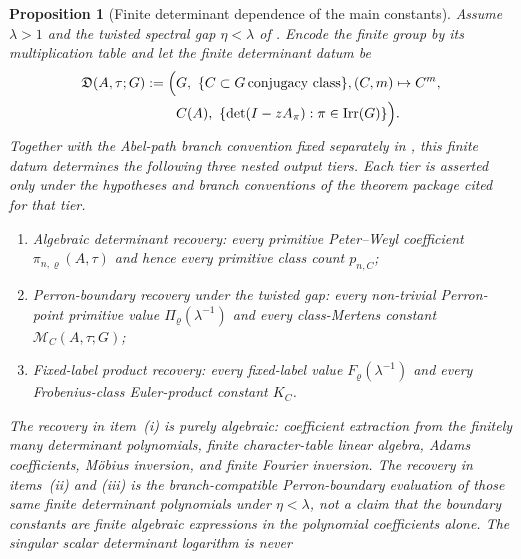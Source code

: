 \documentclass[11pt,a4paper]{amsart}
\theoremstyle{plain}
\newtheorem{proposition}[theorem]{Proposition}
\theoremstyle{definition}
\theoremstyle{remark}
\DeclareMathOperator{\Irr}{Irr}
\begin{document}
\begin{proposition}[Finite determinant dependence of the main constants]
  \label{prop:finite-data-main-chain-closure}
  \label{prop:finite-data-main-spine-closure}
  Assume \(\lambda>1\) and the twisted spectral gap
  \(\eta<\lambda\) of .  Encode the finite
  group by its multiplication table and let the finite determinant datum be
  \begin{equation*}
    \begin{aligned}
      \mathfrak D(A,\tau;G):=
      \Bigl(&G,\ \{C\subset G\,\textup{conjugacy class}\},
      (C,m)\mapsto C^m, \\
      &C(A),\ \{\det(I-zA_\pi):\pi\in\Irr(G)\}\Bigr).
    \end{aligned}
  \end{equation*}
  Together with the Abel-path branch convention fixed separately in
  , this
  finite datum determines the following three nested output tiers.  Each tier
  is asserted only under the hypotheses and branch conventions of the theorem
  package cited for that tier.
  \begin{enumerate}[label=\textup{(\roman*)},leftmargin=*]
    \item \emph{Algebraic determinant recovery:} every primitive Peter--Weyl coefficient
    \(\pi_{n,\varrho}(A,\tau)\) and hence every primitive class count
    \(p_{n,C}\);
    \item \emph{Perron-boundary recovery under the twisted gap:} every non-trivial Perron-point primitive value
    \(\Pi_\varrho(\lambda^{-1})\) and every class-Mertens constant
    \(\mathcal M_C(A,\tau;G)\);
    \item \emph{Fixed-label product recovery:} every fixed-label value \(F_\varrho(\lambda^{-1})\) and every
    Frobenius-class Euler-product constant \(K_C\).
  \end{enumerate}
  The recovery in item~\textup{(i)} is purely algebraic: coefficient
  extraction from the finitely many determinant polynomials, finite
  character-table linear algebra, Adams coefficients, M\"obius inversion, and
  finite Fourier inversion.  The recovery in items~\textup{(ii)} and
  \textup{(iii)} is the branch-compatible Perron-boundary evaluation of those
  same finite determinant polynomials under \(\eta<\lambda\), not a claim that
  the boundary constants are finite algebraic expressions in the polynomial
  coefficients alone.  The singular scalar determinant logarithm is never

\end{proposition}
\end{document}
